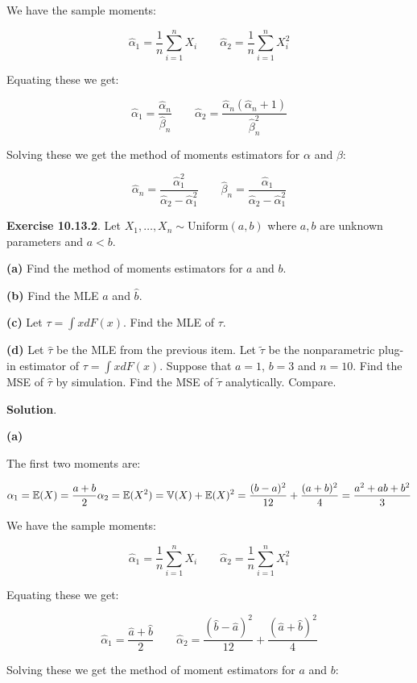 We have the sample moments:

\[\hat{\alpha}_1 = \frac{1}{n}\sum_{i=1}^n X_i
\quad \quad
\hat{\alpha}_2 = \frac{1}{n}\sum_{i=1}^n X_i^2\]

Equating these we get:

\[
\hat{\alpha}_1 = \frac{\hat{\alpha}_n}{\hat{\beta}_n}
\quad \quad
\hat{\alpha}_2 = \frac{\hat{\alpha}_n(\hat{\alpha}_n + 1)}{\hat{\beta}_n^2}
\]

Solving these we get the method of moments estimators for \(\alpha\) and
\(\beta\):

\[
\hat{\alpha}_n = \frac{\hat{\alpha}_1^2}{\hat{\alpha}_2 - \hat{\alpha}_1^2}
\quad \quad
\hat{\beta}_n = \frac{\hat{\alpha}_1}{\hat{\alpha}_2 - \hat{\alpha}_1^2}
\]

\textbf{Exercise 10.13.2}. Let
\(X_1, \dots, X_n \sim \text{Uniform}(a, b)\) where \(a, b\) are unknown
parameters and \(a < b\).

\textbf{(a)} Find the method of moments estimators for \(a\) and \(b\).

\textbf{(b)} Find the MLE \(\hat{a}\) and \(\hat{b}\).

\textbf{(c)} Let \(\tau = \int x dF(x)\). Find the MLE of \(\tau\).

\textbf{(d)} Let \(\hat{\tau}\) be the MLE from the previous item. Let
\(\tilde{\tau}\) be the nonparametric plug-in estimator of
\(\tau = \int x dF(x)\). Suppose that \(a = 1\), \(b = 3\) and
\(n = 10\). Find the MSE of \(\hat{\tau}\) by simulation. Find the MSE
of \(\tilde{\tau}\) analytically. Compare.

\textbf{Solution}.

\textbf{(a)}

The first two moments are:

\[ 
\alpha_1 = \mathbb{E}(X) = \frac{a + b}{2} \\
\alpha_2 = \mathbb{E}(X^2) = \mathbb{V}(X) + \mathbb{E}(X)^2 = \frac{(b - a)^2}{12} + \frac{(a + b)^2}{4}
= \frac{a^2 + ab + b^2}{3}
\]

We have the sample moments:

\[\hat{\alpha}_1 = \frac{1}{n}\sum_{i=1}^n X_i
\quad \quad
\hat{\alpha}_2 = \frac{1}{n}\sum_{i=1}^n X_i^2\]

Equating these we get:

\[
\hat{\alpha}_1 = \frac{\hat{a} + \hat{b}}{2}
\quad \quad
\hat{\alpha}_2 = \frac{(\hat{b} - \hat{a})^2}{12} + \frac{(\hat{a} + \hat{b})^2}{4}
\]

Solving these we get the method of moment estimators for \(a\) and
\(b\):

